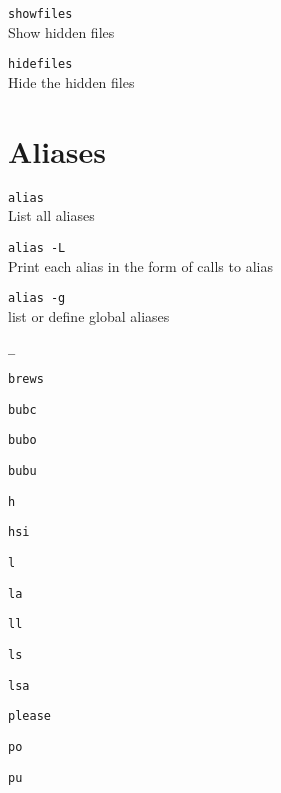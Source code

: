 \documentclass[a4paper,landscape,columns=3]{cheatsheet}
\begin{document}
\texttt{showfiles}\\
 Show hidden files

\texttt{hidefiles}\\
 Hide the hidden files
 
\columnbreak

\section{Aliases}

\texttt{alias}\\
List all aliases

\texttt{alias -L}\\
Print each alias in the form of calls to alias

\texttt{alias -g}\\
list or define global aliases

\texttt{\_}\\
{}

\texttt{brews}\\
{}

\texttt{bubc}\\
{}

\texttt{bubo}\\
{}

\texttt{bubu}\\
{} 

\texttt{h}\\
{}

\texttt{hsi}\\
{}

\texttt{l}\\
{}

\texttt{la}\\
{}

\texttt{ll}\\
{}

\texttt{ls}\\
{}

\texttt{lsa}\\
{}

\texttt{please}\\
{}

\texttt{po}\\
{}

\texttt{pu}\\
{}
\end{document}

